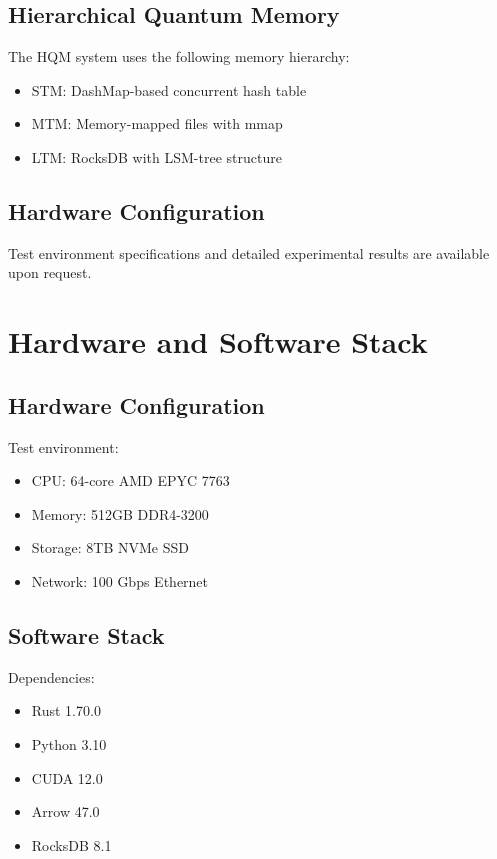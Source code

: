 \documentclass[10pt,twocolumn]{article}
\begin{document}
\subsection{Hierarchical Quantum Memory}

The HQM system uses the following memory hierarchy:

\begin{itemize}
    \item STM: DashMap-based concurrent hash table
    \item MTM: Memory-mapped files with mmap
    \item LTM: RocksDB with LSM-tree structure
\end{itemize}

\subsection{Hardware Configuration}

Test environment specifications and detailed experimental results are available upon request.

\section{Hardware and Software Stack}
\subsection{Hardware Configuration}
Test environment:
\begin{itemize}
    \item CPU: 64-core AMD EPYC 7763
    \item Memory: 512GB DDR4-3200
    \item Storage: 8TB NVMe SSD
    \item Network: 100 Gbps Ethernet
\end{itemize}

\subsection{Software Stack}
Dependencies:
\begin{itemize}
    \item Rust 1.70.0
    \item Python 3.10
    \item CUDA 12.0
    \item Arrow 47.0
    \item RocksDB 8.1
\end{itemize}
\end{document}
